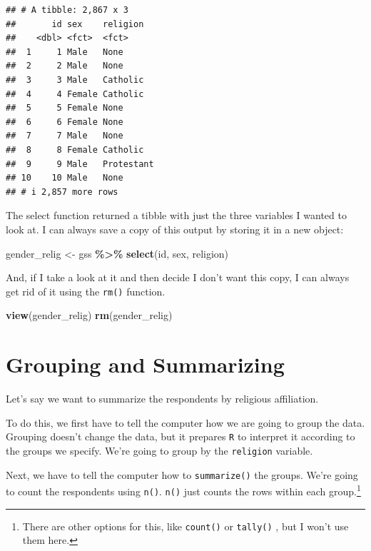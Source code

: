 \documentclass[
]{book}
\newenvironment{Shaded}{\begin{snugshade}}{\end{snugshade}}
\newcommand{\FunctionTok}[1]{\textcolor[rgb]{0.13,0.29,0.53}{\textbf{#1}}}
\newcommand{\NormalTok}[1]{#1}
\newcommand{\OtherTok}[1]{\textcolor[rgb]{0.56,0.35,0.01}{#1}}
\newcommand{\SpecialCharTok}[1]{\textcolor[rgb]{0.81,0.36,0.00}{\textbf{#1}}}
\begin{document}
\begin{verbatim}
## # A tibble: 2,867 x 3
##       id sex    religion  
##    <dbl> <fct>  <fct>     
##  1     1 Male   None      
##  2     2 Male   None      
##  3     3 Male   Catholic  
##  4     4 Female Catholic  
##  5     5 Female None      
##  6     6 Female None      
##  7     7 Male   None      
##  8     8 Female Catholic  
##  9     9 Male   Protestant
## 10    10 Male   None      
## # i 2,857 more rows
\end{verbatim}

The select function returned a tibble with just the three variables I wanted to look at. I can always save a copy of this output by storing it in a new object:

\begin{Shaded}
\begin{Highlighting}[]
\NormalTok{gender\_relig }\OtherTok{\textless{}{-}}\NormalTok{ gss }\SpecialCharTok{\%\textgreater{}\%}
  \FunctionTok{select}\NormalTok{(id, sex, religion)}
\end{Highlighting}
\end{Shaded}

And, if I take a look at it and then decide I don't want this copy, I can always get rid of it using the \texttt{rm()} function.

\begin{Shaded}
\begin{Highlighting}[]
\FunctionTok{view}\NormalTok{(gender\_relig)}
\FunctionTok{rm}\NormalTok{(gender\_relig)}
\end{Highlighting}
\end{Shaded}

\hypertarget{grouping-and-summarizing}{%
\section{Grouping and Summarizing}\label{grouping-and-summarizing}}

Let's say we want to summarize the respondents by religious affiliation.

To do this, we first have to tell the computer how we are going to group the data. Grouping doesn't change the data, but it prepares \texttt{R} to interpret it according to the groups we specify. We're going to group by the \texttt{religion} variable.

Next, we have to tell the computer how to \texttt{summarize()} the groups. We're going to count the respondents using \texttt{n()}. \texttt{n()} just counts the rows within each group.\footnote{There are other options for this, like \texttt{count()} or \texttt{tally()} , but I won't use them here.}
\end{document}
